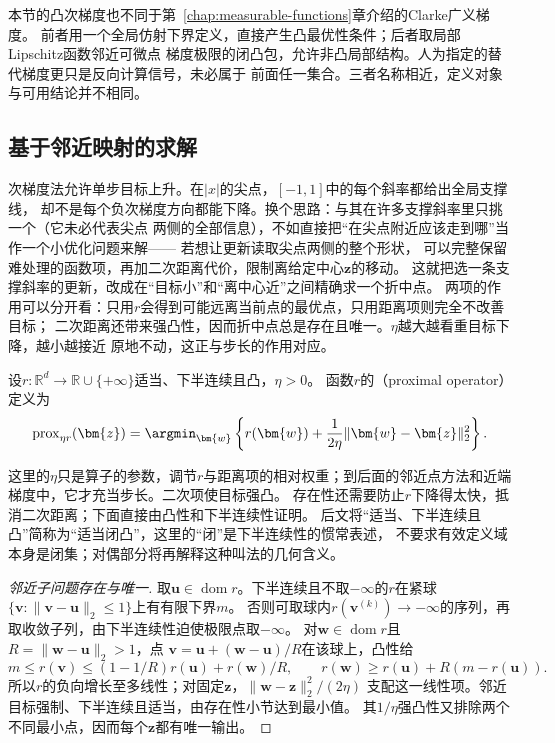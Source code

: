 本节的凸次梯度也不同于第~\ref{chap:measurable-functions}章介绍的Clarke广义梯度。
前者用一个全局仿射下界定义，直接产生凸最优性条件；后者取局部Lipschitz函数邻近可微点
梯度极限的闭凸包，允许非凸局部结构。人为指定的替代梯度更只是反向计算信号，未必属于
前面任一集合。三者名称相近，定义对象与可用结论并不相同。

\subsection{基于邻近映射的求解}
\label{sec:opt-nonsmooth-proximal}
\label{sec:opt-weaker-curvature}

次梯度法允许单步目标上升。在$|x|$的尖点，$[-1,1]$中的每个斜率都给出全局支撑线，
却不是每个负次梯度方向都能下降。换个思路：与其在许多支撑斜率里只挑一个（它未必代表尖点
两侧的全部信息），不如直接把“在尖点附近应该走到哪”当作一个小优化问题来解——
若想让更新读取尖点两侧的整个形状，
可以完整保留难处理的函数项，再加二次距离代价，限制离给定中心$\bm z$的移动。
这就把选一条支撑斜率的更新，改成在“目标小”和“离中心近”之间精确求一个折中点。
两项的作用可以分开看：只用$r$会得到可能远离当前点的最优点，只用距离项则完全不改善目标；
二次距离还带来强凸性，因而折中点总是存在且唯一。$\eta$越大越看重目标下降，越小越接近
原地不动，这正与步长的作用对应。
\begin{definition}[凸函数的邻近算子]
\label{def:opt-proximal-operator}
设$r:\mathbb R^d\to\mathbb R\cup\{+\infty\}$适当、下半连续且凸，$\eta>0$。
函数$r$的（proximal operator）定义为
\[
  \operatorname{prox}_{\eta r}(\bm{z})
  =\argmin_{\bm{w}}
  \left\{r(\bm{w})+\frac{1}{2\eta}
  \lVert\bm{w}-\bm{z}\rVert_2^2\right\}.
\]
\end{definition}
这里的$\eta$只是算子的参数，调节$r$与距离项的相对权重；到后面的邻近点方法和近端梯度中，它才充当步长。二次项使目标强凸。
存在性还需要防止$r$下降得太快，抵消二次距离；下面直接由凸性和下半连续性证明。
后文将“适当、下半连续且凸”简称为“适当闭凸”，这里的“闭”是下半连续性的惯常表述，
不要求有效定义域本身是闭集；对偶部分将再解释这种叫法的几何含义。

\begin{proof}[邻近子问题存在与唯一]
取$\bm u\in\operatorname{dom}r$。下半连续且不取$-\infty$的$r$在紧球
$\{\bm v:\|\bm v-\bm u\|_2\leq1\}$上有有限下界$m$。
否则可取球内$r(\bm v^{(k)})\to-\infty$的序列，再取收敛子列，由下半连续性迫使极限点取$-\infty$。
对$\bm w\in\operatorname{dom}r$且$R=\|\bm w-\bm u\|_2>1$，点
$\bm v=\bm u+(\bm w-\bm u)/R$在该球上，凸性给
\[
 m\leq r(\bm v)\leq(1-1/R)r(\bm u)+r(\bm w)/R,
 \qquad
 r(\bm w)\geq r(\bm u)+R(m-r(\bm u)).
\]
所以$r$的负向增长至多线性；对固定$\bm z$，$\|\bm w-\bm z\|_2^2/(2\eta)$
支配这一线性项。邻近目标强制、下半连续且适当，由存在性小节达到最小值。
其$1/\eta$强凸性又排除两个不同最小点，因而每个$\bm z$都有唯一输出。
\end{proof}

